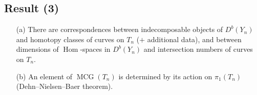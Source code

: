 \documentclass[a0,landscape]{a0poster}
\theoremstyle{plain}
\newtheorem{theorem}{Theorem}[section]
\theoremstyle{definition}
\DeclareMathOperator{\Hom}{\mathrm{Hom}}
\DeclareMathOperator{\MCG}{\mathrm{MCG}}
\begin{document}
\begin{multicols}{3}
    \subsection{Result (3)}
    \begin{enumerate}
        \item[(a)] There are correspondences between indecomposable objects of $D^b(Y_{n})$ and homotopy classes of curves on $T_{n}$ ($+$ additional data), and between dimensions of $\Hom$-spaces in $D^b(Y_{n})$ and intersection numbers of curves on $T_{n}$.
        \item[(b)] An element of $\MCG(T_{n})$ is determined by its action on $\pi_1(T_{n})$ (Dehn--Nielsen--Baer theorem).
    \end{enumerate}




\end{multicols}
\end{document}
